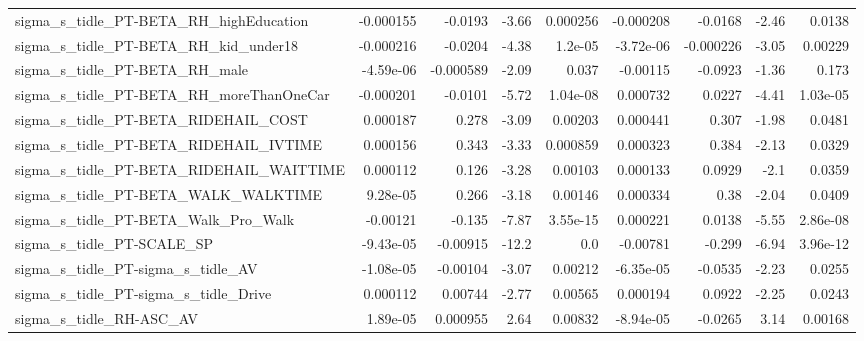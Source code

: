 \begin{tabular}{lrrrrrrrr}
sigma\_s\_tidle\_PT-BETA\_RH\_highEducation             &   -0.000155 &      -0.0193 &     -3.66 & 0.000256 &  -0.000208 &     -0.0168 &        -2.46 &        0.0138 \\
sigma\_s\_tidle\_PT-BETA\_RH\_kid\_under18               &   -0.000216 &      -0.0204 &     -4.38 &  1.2e-05 &  -3.72e-06 &   -0.000226 &        -3.05 &       0.00229 \\
sigma\_s\_tidle\_PT-BETA\_RH\_male                      &   -4.59e-06 &    -0.000589 &     -2.09 &    0.037 &   -0.00115 &     -0.0923 &        -1.36 &         0.173 \\
sigma\_s\_tidle\_PT-BETA\_RH\_moreThanOneCar            &   -0.000201 &      -0.0101 &     -5.72 & 1.04e-08 &   0.000732 &      0.0227 &        -4.41 &      1.03e-05 \\
sigma\_s\_tidle\_PT-BETA\_RIDEHAIL\_COST                &    0.000187 &        0.278 &     -3.09 &  0.00203 &   0.000441 &       0.307 &        -1.98 &        0.0481 \\
sigma\_s\_tidle\_PT-BETA\_RIDEHAIL\_IVTIME              &    0.000156 &        0.343 &     -3.33 & 0.000859 &   0.000323 &       0.384 &        -2.13 &        0.0329 \\
sigma\_s\_tidle\_PT-BETA\_RIDEHAIL\_WAITTIME            &    0.000112 &        0.126 &     -3.28 &  0.00103 &   0.000133 &      0.0929 &         -2.1 &        0.0359 \\
sigma\_s\_tidle\_PT-BETA\_WALK\_WALKTIME                &    9.28e-05 &        0.266 &     -3.18 &  0.00146 &   0.000334 &        0.38 &        -2.04 &        0.0409 \\
sigma\_s\_tidle\_PT-BETA\_Walk\_Pro\_Walk                &    -0.00121 &       -0.135 &     -7.87 & 3.55e-15 &   0.000221 &      0.0138 &        -5.55 &      2.86e-08 \\
sigma\_s\_tidle\_PT-SCALE\_SP                          &   -9.43e-05 &     -0.00915 &     -12.2 &      0.0 &   -0.00781 &      -0.299 &        -6.94 &      3.96e-12 \\
sigma\_s\_tidle\_PT-sigma\_s\_tidle\_AV                  &   -1.08e-05 &     -0.00104 &     -3.07 &  0.00212 &  -6.35e-05 &     -0.0535 &        -2.23 &        0.0255 \\
sigma\_s\_tidle\_PT-sigma\_s\_tidle\_Drive               &    0.000112 &      0.00744 &     -2.77 &  0.00565 &   0.000194 &      0.0922 &        -2.25 &        0.0243 \\
sigma\_s\_tidle\_RH-ASC\_AV                            &    1.89e-05 &     0.000955 &      2.64 &  0.00832 &  -8.94e-05 &     -0.0265 &         3.14 &       0.00168 \\

\end{tabular}
